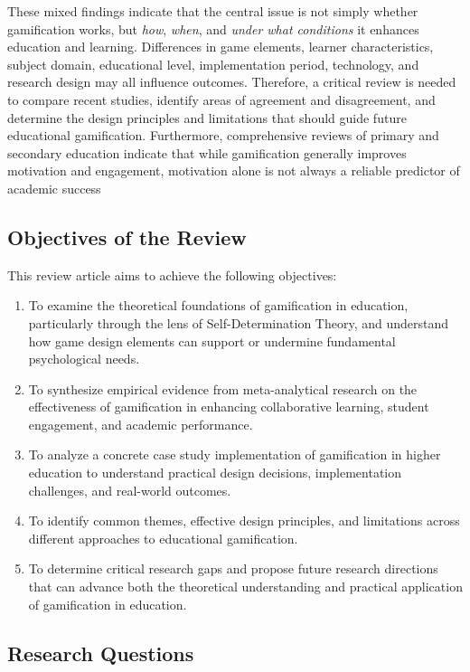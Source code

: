 \documentclass[12pt,a4paper]{article}
\begin{document}
\begin{justify}
These mixed findings indicate that the central issue is not simply whether gamification works, but \textit{how}, \textit{when}, and \textit{under what conditions} it enhances education and learning. Differences in game elements, learner characteristics, subject domain, educational level, implementation period, technology, and research design may all influence outcomes. Therefore, a critical review is needed to compare recent studies, identify areas of agreement and disagreement, and determine the design principles and limitations that should guide future educational gamification. Furthermore, comprehensive reviews of primary and secondary education indicate that while gamification generally improves motivation and engagement, motivation alone is not always a reliable predictor of academic success \parencite{ruiz2024impact}

\subsection{Objectives of the Review}

This review article aims to achieve the following objectives:

\begin{enumerate}
    \item To examine the theoretical foundations of gamification in education, particularly through the lens of Self-Determination Theory, and understand how game design elements can support or undermine fundamental psychological needs.
    \item To synthesize empirical evidence from meta-analytical research on the effectiveness of gamification in enhancing collaborative learning, student engagement, and academic performance.
    \item To analyze a concrete case study implementation of gamification in higher education to understand practical design decisions, implementation challenges, and real-world outcomes.
    \item To identify common themes, effective design principles, and limitations across different approaches to educational gamification.
    \item To determine critical research gaps and propose future research directions that can advance both the theoretical understanding and practical application of gamification in education.
\end{enumerate}


\subsection{Research Questions}


\end{justify}
\end{document}
